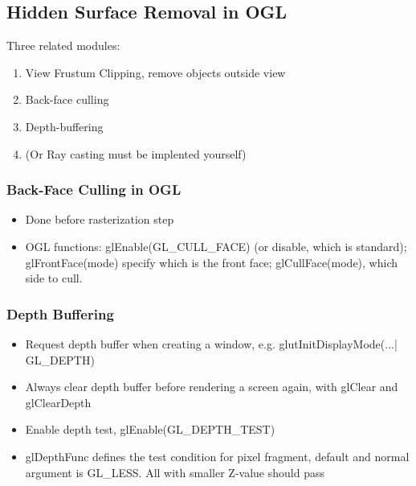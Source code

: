\documentclass[11pt]{article}
\begin{document}
\subsection{Hidden Surface Removal in OGL}
Three related modules:
\begin{enumerate}
    \item View Frustum Clipping, remove objects outside view
    \item Back-face culling
    \item Depth-buffering
    \item (Or Ray casting must be implented yourself)
\end{enumerate}

\subsubsection*{Back-Face Culling in OGL}
\begin{itemize}
    \item Done before rasterization step
    \item OGL functions: glEnable(GL\_CULL\_FACE) (or disable, which is standard); glFrontFace(mode) specify which is the front face; glCullFace(mode), which side to cull.
\end{itemize}

\subsubsection*{Depth Buffering}
\begin{itemize}
    \item Request depth buffer when creating a window, e.g. glutInitDisplayMode(...| GL\_DEPTH)
    \item Always clear depth buffer before rendering a screen again, with glClear and glClearDepth
    \item Enable depth test, glEnable(GL\_DEPTH\_TEST)
    \item glDepthFunc defines the test condition for pixel fragment, default and normal argument is GL\_LESS. All with smaller Z-value should pass
\end{itemize}
\end{document}
